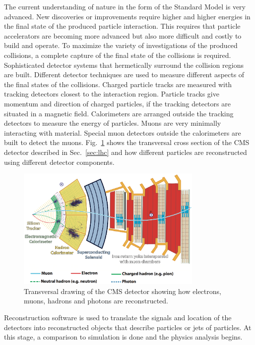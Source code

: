 \documentclass{wscpaperproc}
\theoremstyle{wsc}
\begin{document}
The current understanding of nature in the form of the Standard Model is very advanced. New discoveries or improvements require higher and higher energies in the final state of the produced particle interaction. This requires that particle accelerators are becoming more advanced but also more difficult and costly to build and operate. To maximize the variety of investigations of the produced collisions, a complete capture of the final state of the collisions is required. Sophisticated detector systems that hermetically surround the collision regions are built. Different detector techniques are used to measure different aspects of the final states of the collisions. Charged particle tracks are measured with tracking detectors closest to the interaction region. Particle tracks give momentum and direction of charged particles, if the tracking detectors are situated in a magnetic field. Calorimeters are arranged outside the tracking detectors to measure the energy of particles. Muons are very minimally interacting with material. Special muon detectors outside the calorimeters are built to detect the muons. Fig.~\ref{fig:cmscross} shows the transversal cross section of the CMS detector described in Sec.~\ref{sec:lhc} and how different particles are reconstructed using different detector components.

\begin{figure}[htb]
{
   \centering
   \includegraphics[width=0.80\textwidth]{cms_transversal_drawing}
   \caption{Transversal drawing of the CMS detector showing how electrons, muons, hadrons and photons are reconstructed.
   \label{fig:cmscross}}
}
\end{figure}

Reconstruction software is used to translate the signals and location of the detectors into reconstructed objects that describe particles or jets of particles. At this stage, a comparison to simulation is done and the physics analysis begins.
\end{document}
